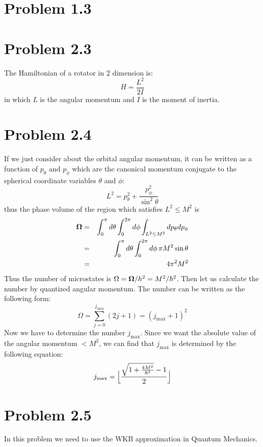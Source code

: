 \documentclass{article}
\begin{document}
\section*{Problem 1.3}
\section*{Problem 2.3}
The Hamiltonian of a rotator in 2 dimension is:
\begin{equation}
H = \frac{L^2}{2I}
\end{equation}
in which $L$ is the angular momentum and $I$ is the moment of inertia.
\section*{Problem 2.4}
If we just consider about the orbital angular momentum, it can be written as a function of $p_\theta$ and $p_\phi$ which are the canonical momentum conjugate to the spherical coordinate variables $\theta$ and $\phi$: 
\begin{equation}
L^2 = p_\theta^2 + \frac{p_\phi^2}{\sin^2 \theta}
\end{equation}
thus the phase volume of the region which satisfies $L^2 \leq M^2$ is
\begin{eqnarray}
\bf{\Omega}& = &\int_0^\pi d\theta \int_0^{2\pi} d\phi \int_{L^2\leq M^2} dp_\theta dp_\phi\nonumber\\
&=& \int_0^\pi d\theta \int_0^{2\pi} d\phi \, \pi  M^2\sin\theta\nonumber\\
&=& 4\pi^2 M^2
\end{eqnarray}
Thus the number of microstates is $\Omega = {\bf{\Omega}}/h^2 = M^2/\hbar^2$. Then let us calculate the number by quantized angular momentum. The number can be written as the following form:
\begin{equation}
\Omega = \sum_{j=0}^{j_{\mathrm{max}}}(2j+1) = (j_{\mathrm{max}}+1)^2
\end{equation}
Now we have to determine the number $j_{\mathrm{max}}$. Since we want the absolute value of the angular momentum $< M^2$, we can find that $j_{\mathrm{max}}$ is determined by the following equation:
\begin{equation}
j_{\mathrm{max}} = \Big{\lfloor} \frac{\sqrt{1+\frac{4M^2}{\hbar^2}}-1}{2}\Big{\rfloor}
\end{equation}


\section*{Problem 2.5}
In this problem we need to use the WKB approximation in Quantum Mechanics.
\end{document}
